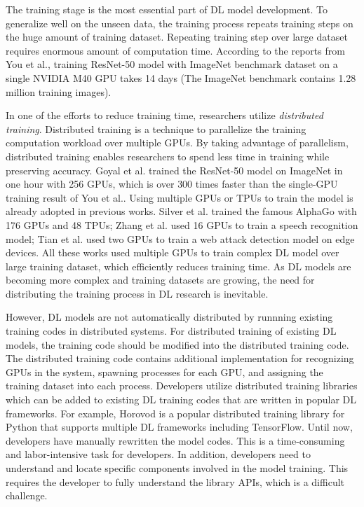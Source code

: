 The training stage is the most essential part of DL model development.
To generalize well on the unseen data,
the training process repeats training steps on the huge amount of
training dataset.
Repeating training step over large dataset requires enormous
amount of computation time.
According to the reports from You et al.\cite{imagenettraining2017},
training ResNet-50 model with ImageNet benchmark dataset on a 
single NVIDIA M40 GPU takes 14 days (The ImageNet benchmark\cite{imagenet2014} 
contains 1.28 million training images). 

In one of the efforts to reduce training time, 
researchers utilize \textit{distributed training}.
Distributed training is a technique to parallelize the training computation
workload over multiple GPUs.
By taking advantage of parallelism, distributed training enables researchers
to spend less time in training while preserving accuracy.
Goyal et al.\cite{facebook2018} trained the ResNet-50 model on ImageNet
in one hour with 256 GPUs, which is over 300 times faster than the
single-GPU training result of You et al.\cite{imagenettraining2017}.
Using multiple GPUs or TPUs to train the model is already adopted
in previous works.
Silver et al.\cite{Silver2017alphagozero} trained the famous AlphaGo 
with 176 GPUs and 48 TPUs;
Zhang et al.\cite{zhang2019distrspeech} used 16 GPUs to train
a speech recognition model;
Tian et al.\cite{tian2020distrwebattack} used 
two GPUs to train a web attack detection model on edge devices.
All these works used multiple GPUs to train complex DL model
over large training dataset, which efficiently reduces training time.
As DL models are becoming more complex and training datasets are growing,
the need for distributing the training process in DL research is inevitable.

However, DL models are not automatically distributed
by runnning existing training codes in distributed systems.
For distributed training of existing DL models,
the training code should be modified into the distributed training code.
The distributed training code contains additional implementation
for recognizing GPUs in the system, spawning processes for each GPU,
and assigning the training dataset into each process.
Developers utilize distributed training libraries which can be
added to existing DL training codes that are written in popular
DL frameworks. For example, Horovod\cite{sergeev2018horovod} is a
popular distributed training library for Python that supports multiple
DL frameworks including TensorFlow.
Until now, developers have manually rewritten the model codes.
This is a time-consuming and labor-intensive task for developers.
In addition, developers need to understand and locate 
specific components involved in the model training.
This requires the developer to fully understand the library APIs,
which is a difficult challenge.

